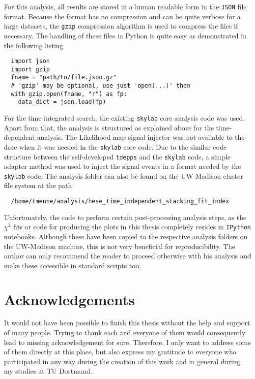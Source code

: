 For this analysis, all results are stored in a human readable form in the \lstinline!JSON! file format.
Because the format has no compression and can be quite verbose for a large datasets, the \lstinline!gzip! compression algorithm is used to compress the files if necessary.
The handling of these files in Python is quite easy as demonstrated in the following listing
\begin{lstlisting}
  import json
  import gzip
  fname = "path/to/file.json.gz"
  # 'gzip' may be optional, use just 'open(...)' then
  with gzip.open(fname, "r") as fp:
    data_dict = json.load(fp)
\end{lstlisting}

For the time-integrated search, the existing \lstinline!skylab! core analysis code was used.
Apart from that, the analysis is structured as explained above for the time-dependent analysis.
The Likelihood map signal injector was not available to the date when it was needed in the \lstinline!skylab! core code.
Due to the similar code structure between the self-developed \lstinline!tdepps! and the \lstinline!skylab! code, a simple adapter method was used to inject the signal events in a format needed by the \lstinline!skylab! code.
The analysis folder can also be found on the UW-Madison cluster file system at the path
\begin{lstlisting}
  /home/tmenne/analysis/hese_time_independent_stacking_fit_index
\end{lstlisting}
Unfortunately, the code to perform certain post-processing analysis steps, as the $\chi^2$ fits or code for producing the plots in this thesis completely resides in \lstinline!IPython! notebooks.
Although these have been copied to the respective analysis folders on the UW-Madison machine, this is not very beneficial for reproducibility.
The author can only recommend the reader to proceed otherwise with his analysis and make these accessible in standard scripts too.

\newpage
\section{Acknowledgements}
It would not have been possible to finish this thesis without the help and support of many people.
Trying to thank each and everyone of them would consequently lead to missing acknowledgement for sure.
Therefore, I only want to address some of them directly at this place, but also express my gratitude to everyone who participated in any way during the creation of this work and in general during my studies at TU Dortmund.

